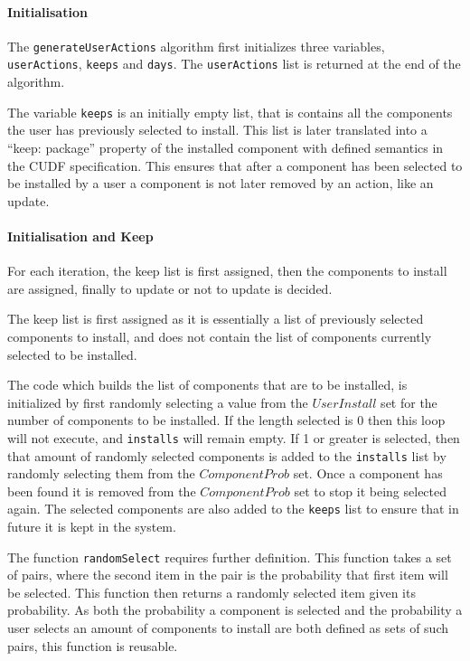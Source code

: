 \paragraph{Initialisation}
The \verb+generateUserActions+ algorithm first initializes three variables, \verb+userActions+, \verb+keeps+ and \verb+days+.
The \verb+userActions+ list is returned at the end of the algorithm.

The variable \verb+keeps+ is an initially empty list, that is contains all the components the user has previously selected to install.
This list is later translated into a ``keep: package'' property of the installed component with defined semantics in the CUDF specification.
This ensures that after a component has been selected to be installed by a user a component is not later removed by an action, like an update.


\paragraph{Initialisation and Keep}
For each iteration, the keep list is first assigned, then the components to install are assigned, finally to update or not to update is decided.

The keep list is first assigned as it is essentially a list of previously selected components to install, and does not contain the list of components currently selected to be installed.

The code which builds the list of components that are to be installed, is initialized by first randomly selecting a value from the $UserInstall$ set for the number of components to be installed.
If the length selected is 0 then this loop will not execute, and \verb+installs+ will remain empty.
If 1 or greater is selected, then that amount of randomly selected components is added to the \verb+installs+ list by randomly selecting them from the $ComponentProb$ set.
Once a component has been found it is removed from the $ComponentProb$ set to stop it being selected again.
The selected components are also added to the \verb+keeps+ list to ensure that in future it is kept in the system.
 
The function \verb+randomSelect+ requires further definition.
This function takes a set of pairs, where the second item in the pair is the probability that first item will be selected.
This function then returns a randomly selected item given its probability.
As both the probability a component is selected and the probability a user selects an amount of components to install are both defined as sets of such pairs, this function is reusable.

